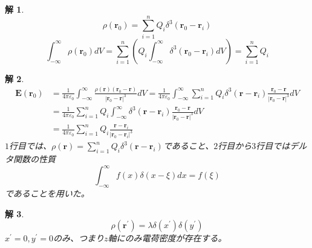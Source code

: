 \documentclass{jsarticle}
\newtheorem{ans}{解}[section]
\begin{document}
\begin{ans}~\\
\[\rho(\bm{r}_{0})=\sum_{i=1}^{n}Q_{i}\delta^{3}(\bm{r}_{0}-\bm{r}_{i})\]
\[\int_{-\infty}^{\infty}\rho(\bm{r}_{0})dV=\sum_{i=1}^{n}\left(Q_{i}\int_{-\infty}^{\infty}\delta^{3}(\bm{r}_{0}-\bm{r}_{i})dV\right)=\sum_{i=1}^{n}Q_{i}\]
\end{ans}

\begin{ans}~\\
\begin{align*}
\bm{E}(\bm{r}_{0})&=\frac{1}{4\pi\varepsilon_{0}}\int_{-\infty}^{\infty}\frac{\rho(\bm{r})(\bm{r}_{0}-\bm{r})}{\left|\bm{r}_{0}-\bm{r}\right|^{3}}dV=\frac{1}{4\pi\varepsilon_{0}}\int_{-\infty}^{\infty}\sum_{i=1}^{n}Q_{i}\delta^{3}(\bm{r}-\bm{r}_{i})\frac{\bm{r}_{0}-\bm{r}}{\left|\bm{r}_{0}-\bm{r}\right|^{3}}dV\\
&=\frac{1}{4\pi\varepsilon_{0}}\sum_{i=1}^{n}Q_{i}\int_{-\infty}^{\infty}\delta^{3}(\bm{r}-\bm{r}_{i})\frac{\bm{r}_{0}-\bm{r}}{\left|\bm{r}_{0}-\bm{r}\right|^{3}}dV\\
&=\frac{1}{4\pi\varepsilon_{0}}\sum_{i=1}^{n}Q_{i}\frac{\bm{r}-\bm{r}_{i}}{\left|\bm{r}_{0}-\bm{r}_{i}\right|^{3}}
\end{align*}
\(1\)行目では、\(\rho(\bm{r})=\sum_{i=1}^{n}Q_{i}\delta^{3}(\bm{r}-\bm{r}_{i})\)であること、\(2\)行目から\(3\)行目ではデルタ関数の性質
\[\int_{-\infty}^{\infty}f(x)\delta(x-\xi)dx=f(\xi)\]
であることを用いた。
\end{ans}

\begin{ans}~\\
\[\rho(\bm{r}^{\prime})=\lambda\delta(x^{\prime})\delta(y^{\prime})\]
\(x^{\prime}=0,y^{\prime}=0\)のみ、つまり\(z\)軸にのみ電荷密度が存在する。
\end{ans}
\end{document}

